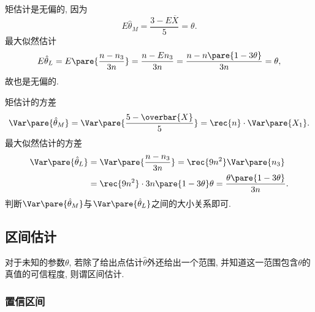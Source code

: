 \documentclass[../Statistics.tex]{subfiles}
\begin{document}
\begin{sample}
\begin{ex}
\begin{cenum}
            \item 矩估计是无偏的, 因为
            \[ E\hat{\theta}_M = \frac{3-E\overbar{X}}{5} = \theta. \]
            最大似然估计
            \[ E\hat{\theta}_L = E\pare{\frac{n-n_3}{3n}} = \frac{n - En_3}{3n} = \frac{n - n\pare{1-3\theta}}{3n} = \theta, \]
            故也是无偏的.
            \item 矩估计的方差
            \[ \Var\pare{\hat\theta_M} = \Var\pare{\frac{5-\overbar{X}}{5}} = \rec{n}\cdot\Var\pare{X_1}. \]
            最大似然估计的方差
            \begin{align*}
                \Var\pare{\hat\theta_L} &= \Var\pare{\frac{n-n_3}{3n}} = \rec{9n^2}\Var\pare{n_3}\\ &= \rec{9n^2} \cdot 3n\pare{1-3\theta}\theta = \frac{\theta\pare{1-3\theta}}{3n}.
            \end{align*}
            判断$\Var\pare{\hat\theta_M}$与$\Var\pare{\hat\theta_L}$之间的大小关系即可.
        \end{cenum}
    \end{ex}
\end{sample}



\subsection{区间估计} %
\label{sub:区间估计}

对于未知的参数$\theta$, 若除了给出点估计$\hat\theta$外还给出一个范围, 并知道这一范围包含$\theta$的真值的可信程度, 则谓区间估计.

\subsubsection{置信区间} %
\label{ssub:置信区间}
\end{document}
